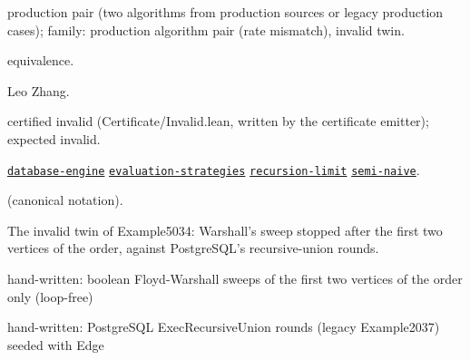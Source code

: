 \documentclass[10pt]{article}
\begin{document}
\begin{description}[leftmargin=2.6cm,style=nextline,itemsep=1pt]

\item[Category] production pair (two algorithms from production sources or legacy production cases); family: production algorithm pair (rate mismatch), invalid twin.

\item[Kind] equivalence.

\item[Contributors] Leo Zhang.

\item[Status] certified invalid (Certificate/Invalid.lean, written by the certificate emitter); expected invalid.

\item[Tags] \hyperref[tag:database-engine]{\texttt{database-engine}} \hyperref[tag:evaluation-strategies]{\texttt{evaluation-strategies}} \hyperref[tag:recursion-limit]{\texttt{recursion-limit}} \hyperref[tag:semi-naive]{\texttt{semi-naive}}.

\item[Input]  (canonical notation).

\item[Summary] The invalid twin of Example5034: Warshall's sweep stopped after the first two vertices of the order, against PostgreSQL's recursive-union rounds.

\item[Sides] hand-written: boolean Floyd-Warshall sweeps of the first two vertices of the order only (loop-free) \par hand-written: PostgreSQL ExecRecursiveUnion rounds (legacy Example2037) seeded with Edge


\end{description}
\end{document}
